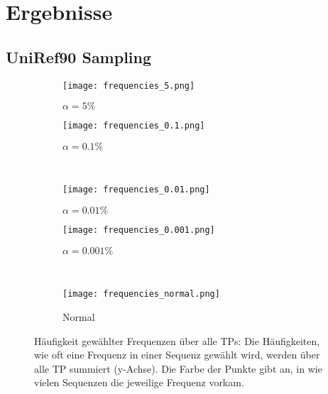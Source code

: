 \section{Ergebnisse} %
    \label{sec:ergebnisse}
    \subsection{UniRef90 Sampling} %
        \label{sub:uniref90_results}
        \begin{figure}[H]
            \centering
            \begin{subfigure}{.45\textwidth}
                \texttt{[image: frequencies\_5.png]}
                \caption{$\alpha=5\%$}
                \label{fig:frequencies_5}
            \end{subfigure}
            \begin{subfigure}{.45\textwidth}
                \texttt{[image: frequencies\_0.1.png]}
                \caption{$\alpha=0.1\%$}
                \label{fig:frequencies_0.1}
            \end{subfigure}\\
            \begin{subfigure}{.45\textwidth}
                \texttt{[image: frequencies\_0.01.png]}
                \caption{$\alpha=0.01\%$}
                \label{fig:frequencies_0.01}
            \end{subfigure}
            \begin{subfigure}{.45\textwidth}
                \texttt{[image: frequencies\_0.001.png]}
                \caption{$\alpha=0.001\%$}
                \label{fig:frequencies_0.001}
            \end{subfigure}\\
            \begin{subfigure}{.45\textwidth}
                \texttt{[image: frequencies\_normal.png]}
                \caption{Normal}
                \label{fig:frequencies_normal}
            \end{subfigure}
            \caption[Häufigkeit gewählter Frequenzen über alle \aclp{TP} ]{Häufigkeit gewählter Frequenzen über alle \aclp{TP}: Die Häufigkeiten, wie oft eine Frequenz in einer Sequenz gewählt wird, werden über alle \ac{TP} summiert (y-Achse). Die Farbe der Punkte gibt an, in wie vielen Sequenzen die jeweilige Frequenz vorkam.}
            \label{fig:frequencies_uniref}
        \end{figure}

